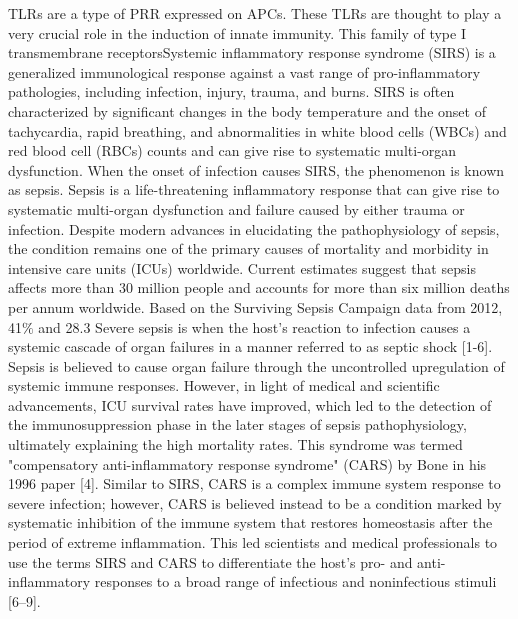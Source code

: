 TLRs are a type of PRR expressed on APCs. These TLRs are thought to play
a very crucial role in the induction of innate immunity. This family of
type I transmembrane receptorsSystemic inflammatory response syndrome (SIRS) is a generalized immunological response against a vast range of pro-inflammatory pathologies, including infection, injury, trauma, and burns. SIRS is often characterized by significant changes in the body temperature and the onset of tachycardia, rapid breathing, and abnormalities in white blood cells (WBCs) and red blood cell (RBCs) counts and can give rise to systematic multi-organ dysfunction. When the onset of infection causes SIRS, the phenomenon is known as sepsis. Sepsis is a life-threatening inflammatory response that can give rise to systematic multi-organ dysfunction and failure caused by either trauma or infection.
Despite modern advances in elucidating the pathophysiology of sepsis, the condition remains one of the primary causes of mortality and morbidity in intensive care units (ICUs) worldwide. Current estimates suggest that sepsis affects more than 30 million people and accounts for more than six million deaths per annum worldwide. Based on the Surviving Sepsis Campaign data from 2012, 41$\%$ and 28.3%
Severe sepsis is when the host's reaction to infection causes a systemic cascade of organ failures in a manner referred to as septic shock [1-6]. Sepsis is believed to cause organ failure through the uncontrolled upregulation of systemic immune responses. However, in light of medical and scientific advancements, ICU survival rates have improved, which led to the detection of the immunosuppression phase in the later stages of sepsis pathophysiology, ultimately explaining the high mortality rates. This syndrome was termed "compensatory anti-inflammatory response syndrome" (CARS) by Bone in his 1996 paper [4]. Similar to SIRS, CARS is a complex immune system response to severe infection; however, CARS is believed instead to be a condition marked by systematic inhibition of the immune system that restores homeostasis after the period of extreme inflammation. This led scientists and medical professionals to use the terms SIRS and CARS to differentiate the host's pro- and anti-inflammatory responses to a broad range of infectious and noninfectious stimuli [6–9].

